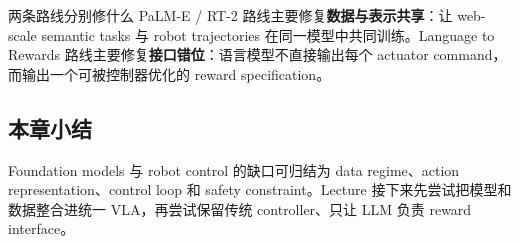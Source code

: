 
\begin{knowledgebox}{两条路线分别修什么}
PaLM-E / RT-2 路线主要修复\textbf{数据与表示共享}：让 web-scale semantic tasks 与 robot trajectories 在同一模型中共同训练。Language to Rewards 路线主要修复\textbf{接口错位}：语言模型不直接输出每个 actuator command，而输出一个可被控制器优化的 reward specification。
\end{knowledgebox}

\subsection{本章小结}

Foundation models 与 robot control 的缺口可归结为 data regime、action representation、control loop 和 safety constraint。Lecture 接下来先尝试把模型和数据整合进统一 VLA，再尝试保留传统 controller、只让 LLM 负责 reward interface。

